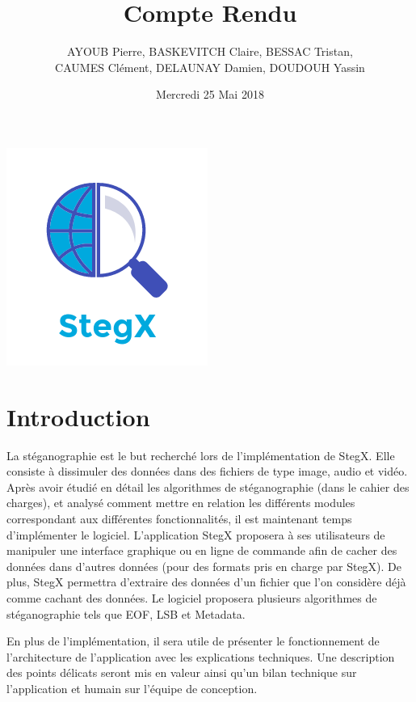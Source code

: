 \documentclass[11pt]{article}
\title{\huge{\textbf Compte Rendu}}
\author{AYOUB Pierre, BASKEVITCH Claire, BESSAC Tristan, \\
CAUMES Clément, DELAUNAY Damien, DOUDOUH Yassin}
\date{Mercredi 25 Mai 2018}
\begin{document}
\maketitle
\vspace{20em}
\begin{center}\includegraphics{pictures/Application.png}\end{center}
\newpage

\tableofcontents

\newpage

\section{Introduction}

La stéganographie est le but recherché lors de l'implémentation de StegX. 
Elle consiste à dissimuler des données dans des fichiers de type image, 
audio et vidéo. 
Après avoir étudié en détail les algorithmes de stéganographie (dans le 
cahier des charges), et analysé comment mettre en relation les différents 
modules correspondant aux différentes fonctionnalités, il est maintenant 
temps d'implémenter le logiciel.
L'application StegX proposera à ses utilisateurs de manipuler une interface 
graphique ou en ligne de commande afin de cacher des données dans d'autres 
données (pour des formats pris en charge par StegX). De plus, StegX permettra 
d'extraire des données d'un fichier que l'on considère déjà comme cachant 
des données. Le logiciel proposera plusieurs algorithmes de stéganographie
tels que EOF, LSB et Metadata. 

En plus de l'implémentation, il sera utile de présenter le fonctionnement 
de l'architecture de l'application avec les explications techniques. 
Une description des points délicats seront mis en valeur ainsi qu'un 
bilan technique sur l'application et humain sur l'équipe de conception. 
\end{document}
